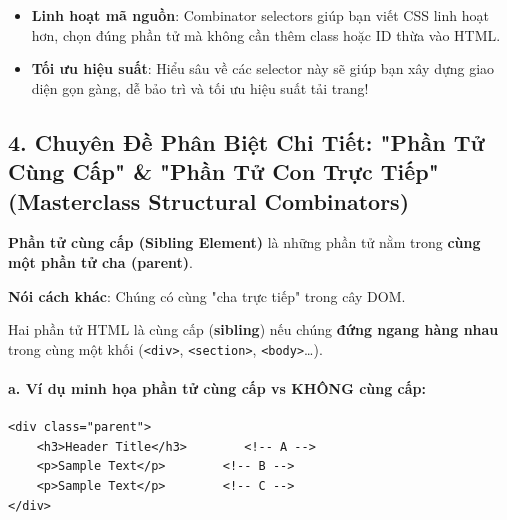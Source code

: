 \documentclass[11pt,oneside]{book}
\newcommand{\codeinline}[1]{\textcolor{accentOrange}{\texttt{#1}}}
\newcommand{\term}[1]{\textbf{\textcolor{primaryBlue}{#1}}}
\begin{document}
\begin{tipBox}
\begin{itemize}[leftmargin=1.5em, itemsep=3pt, parsep=0pt]
    \item \textbf{Linh hoạt mã nguồn}: Combinator selectors giúp bạn viết CSS linh hoạt hơn, chọn đúng phần tử mà không cần thêm class hoặc ID thừa vào HTML.
    \item \textbf{Tối ưu hiệu suất}: Hiểu sâu về các selector này sẽ giúp bạn xây dựng giao diện gọn gàng, dễ bảo trì và tối ưu hiệu suất tải trang!
\end{itemize}
\end{tipBox}



\subsection{4. Chuyên Đề Phân Biệt Chi Tiết: "Phần Tử Cùng Cấp" \& "Phần Tử Con Trực Tiếp" (Masterclass Structural Combinators)}

\begin{conceptBox}
\textbf{Phần tử cùng cấp (\term{Sibling Element})} là những phần tử nằm trong \textbf{cùng một phần tử cha (parent)}.
\par\vspace{3pt}
\textbf{Nói cách khác}: Chúng có cùng "cha trực tiếp" trong cây DOM.
\par\vspace{3pt}
\begin{tipBox}
Hai phần tử HTML là cùng cấp (\term{sibling}) nếu chúng \textbf{đứng ngang hàng nhau} trong cùng một khối (\codeinline{<div>}, \codeinline{<section>}, \codeinline{<body>}\ldots).
\end{tipBox}
\end{conceptBox}

\paragraph{a. Ví dụ minh họa phần tử cùng cấp vs KHÔNG cùng cấp:}

\begin{codeWindow}
\begin{lstlisting}[language=HTML5]
<div class="parent">
    <h3>Header Title</h3>        <!-- A -->
    <p>Sample Text</p>        <!-- B -->
    <p>Sample Text</p>        <!-- C -->
</div>
\end{lstlisting}
\end{codeWindow}
\end{document}
